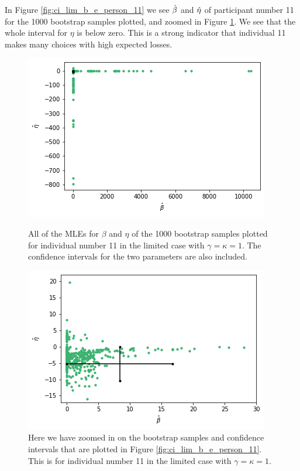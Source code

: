 In Figure \ref{fig:ci_lim_b_e_person_11} we see $\hat{\beta}$ and $\hat{\eta}$ of participant number 11 for the 1000 bootstrap samples plotted, and zoomed in Figure \ref{fig:ci_lim_b_e_person_11_zoomed}. We see that the whole interval for $\eta$ is below zero. This is a strong indicator that individual 11 makes many choices with high expected losses.
\begin{figure}
    \centering
    \begin{minipage}{0.48\textwidth}
        \centering
        \includegraphics[scale=0.37]{pictures/ci_lim_b_e_person11.png}
        \caption[MLEs for $\beta$ and $\eta$ for bootstrap samples individual 11, limited]{All of the MLEs for $\beta$ and $\eta$ of the 1000 bootstrap samples plotted for individual number 11 in the limited case with $\gamma=\kappa=1$. The confidence intervals for the two parameters are also included.}
        \label{fig:ci_lim_b_e_person_11}
    \end{minipage}\hfill
    \begin{minipage}{0.48\textwidth}
        \centering
        \includegraphics[scale=0.37]{pictures/ci_lim_b_e_person11_zoomed.png}
        \caption[MLEs for $\beta$ and $\eta$ of bootstrap samples individual 11, limited, zoomed]{Here we have zoomed in on the bootstrap samples and confidence intervals that are plotted in Figure \ref{fig:ci_lim_b_e_person_11}. This is for individual number 11 in the limited case with $\gamma=\kappa=1$.}
        \label{fig:ci_lim_b_e_person_11_zoomed}
    \end{minipage}
\end{figure}

